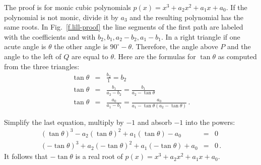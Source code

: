 The proof is for monic cubic polynomials $p(x)=x^3+a_2x^2+a_1x+a_0$. If the polynomial is not monic, divide it by $a_3$ and the resulting polynomial has the same roots. In Fig.~\ref{f.lill-proof} the line segments of the first path are labeled with the coefficients and with $b_2,b_1,a_2-b_2,a_1-b_1$. In a right triangle if one acute angle is $\theta$ the other angle is $90^\circ-\theta$. Therefore, the angle above $P$ and the angle to the left of $Q$ are equal to $\theta$. Here are the formulas for $\tan \theta$ as computed from the three triangles:
\begin{eqnarray*}
\tan \theta &=& \frac{b_2}{1}=b_2\\
\tan \theta &=& \frac{b_1}{a_2-b_2}=\frac{b_1}{a_2-\tan\theta}\\
\tan \theta &=& \frac{a_0}{a_1-b_1}=\frac{a_0}{a_1-\tan\theta(a_2-\tan\theta)}\,.
\end{eqnarray*}

\newpage

Simplify the last equation, multiply by $-1$ and absorb $-1$ into the powers:
\begin{eqnarray*}
(\tan\theta)^3-a_2(\tan\theta)^2+a_1(\tan\theta)-a_0&=&0\\
(-\tan\theta)^3+a_2(-\tan\theta)^2+a_1(-\tan\theta)+a_0&=&0\,.
\end{eqnarray*}
It follows that $-\tan\theta$ is a real root of $p(x)=x^3+a_2x^2+a_1x+a_0$.

